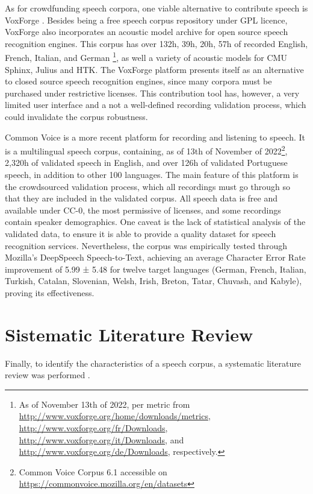 As for crowdfunding speech corpora, one viable alternative to contribute speech is VoxForge \cite{voxforge}. Besides being a free speech corpus repository under GPL licence, VoxForge also incorporates an acoustic model archive for open source speech recognition engines. This corpus has over 132h, 39h, 20h, 57h of recorded English, French, Italian, and German \footnote{As of November 13th of 2022, per metric from \url{http://www.voxforge.org/home/downloads/metrics}, \url{http://www.voxforge.org/fr/Downloads}, \url{http://www.voxforge.org/it/Downloads}, and \url{http://www.voxforge.org/de/Downloads}, respectively.}, as well a variety of acoustic models for CMU Sphinx, Julius and HTK. The VoxForge platform presents itself as an alternative to closed source speech recognition engines, since many corpora must be purchased under restrictive licenses. This contribution tool has, however, a very limited user interface and a not a well-defined recording validation process, which could invalidate the corpus robustness.

Common Voice \cite{ardila2019common} is a more recent platform for recording and listening to speech. It is a multilingual speech corpus, containing, as of 13th of November of 2022\footnote{Common Voice Corpus 6.1 accessible on  \url{https://commonvoice.mozilla.org/en/datasets}}, 2,320h of validated speech in English, and over 126h of validated Portuguese speech, in addition to other 100 languages. The main feature of this platform is the crowdsourced validation process, which all recordings must go through so that they are included in the validated corpus. All speech data is free and available under CC-0, the most permissive of licenses, and some recordings contain speaker demographics. One caveat is the lack of statistical analysis of the validated data, to ensure it is able to provide a quality dataset for speech recognition services. Nevertheless, the corpus was empirically tested through Mozilla’s DeepSpeech Speech-to-Text, achieving an average Character Error Rate improvement of 5.99 ± 5.48 for twelve target languages (German, French, Italian, Turkish, Catalan, Slovenian, Welsh, Irish, Breton, Tatar, Chuvash, and Kabyle), proving its effectiveness.

\section*{Sistematic Literature Review}
Finally, to identify the characteristics of a speech corpus, a systematic literature review was performed \cite{kitchenham2009systematic}.

